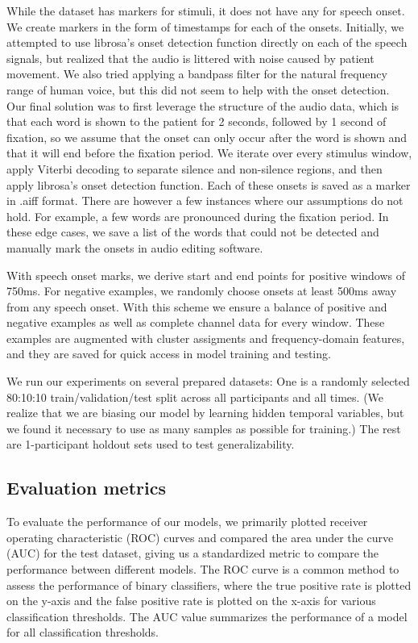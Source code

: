 \documentclass[format=sigconf, nonacm=true, review=true, screen=true]{acmart}
\begin{document}
While the dataset has markers for stimuli, it does not have any for speech onset. We create markers in the form of timestamps for each of the onsets. Initially, we attempted to use librosa's onset detection function directly on each of the speech signals, but realized that the audio is littered with noise caused by patient movement. We also tried applying a bandpass filter for the natural frequency range of human voice, but this did not seem to help with the onset detection. Our final solution was to first leverage the structure of the audio data, which is that each word is shown to the patient for 2 seconds, followed by 1 second of fixation, so we assume that the onset can only occur after the word is shown and that it will end before the fixation period. We iterate over every stimulus window, apply Viterbi decoding to separate silence and non-silence regions, and then apply librosa's onset detection function. Each of these onsets is saved as a marker in .aiff format. There are however a few instances where our assumptions do not hold. For example, a few words are pronounced during the fixation period. In these edge cases, we save a list of the words that could not be detected and manually mark the onsets in audio editing software.

With speech onset marks, we derive start and end points for positive windows of 750ms. For negative examples, we randomly choose onsets at least 500ms away from any speech onset. With this scheme we ensure a balance of positive and negative examples as well as complete channel data for every window. These examples are augmented with cluster assigments and frequency-domain features, and they are saved for quick access in model training and testing.

We run our experiments on several prepared datasets: One is a randomly selected 80:10:10 train/validation/test split across all participants and all times. (We realize that we are biasing our model by learning hidden temporal variables, but we found it necessary to use as many samples as possible for training.) The rest are 1-participant holdout sets used to test generalizability.

\subsection{Evaluation metrics}
To evaluate the performance of our models, we primarily plotted receiver operating characteristic (ROC) curves and compared the area under the curve (AUC) for the test dataset, giving us a standardized metric to compare the performance between different models. The ROC curve is a common method to assess the performance of binary classifiers, where the true positive rate is plotted on the y-axis and the false positive rate is plotted on the x-axis for various classification thresholds. The AUC value summarizes the performance of a model for all classification thresholds. 
\end{document}
